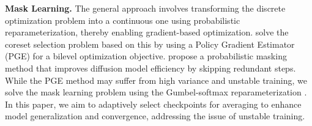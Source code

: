 \textbf{Mask Learning.}
The general approach involves transforming the discrete optimization problem into a continuous one using probabilistic reparameterization, thereby enabling gradient-based optimization. \citet{coreset} solve the coreset selection problem based on this by using a Policy Gradient Estimator (PGE) for a bilevel optimization objective. \citet{zhangefficient} propose a probabilistic masking method that improves diffusion model efficiency by skipping redundant steps.
While the PGE method may suffer from high variance and unstable training, we solve the mask learning problem using the Gumbel-softmax reparameterization \citep{jang2017categorical,maddison2017the}.
In this paper, we aim to adaptively select checkpoints for averaging to enhance model generalization and convergence, addressing the issue of unstable training.